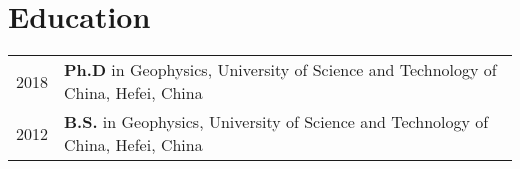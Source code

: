 \section*{Education}
\begin{tabular}{p{} p{}}
2018 & \textbf{Ph.D} in Geophysics, University of Science and Technology of China, Hefei, China \\
2012 & \textbf{B.S.} in Geophysics, University of Science and Technology of China, Hefei, China
\end{tabular}
